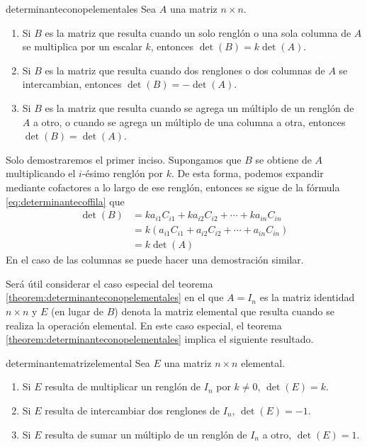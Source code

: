 \begin{theorem}{}{determinanteconopelementales}
    Sea $A$ una matriz $n \times n$.
    \begin{enumerate}[label=\alph*), topsep=6pt, itemsep=0pt]
        \item Si $B$ es la matriz que resulta cuando un solo renglón o una sola columna de $A$ se multiplica por un escalar $k$, entonces $\det(B) = k \det(A)$.
        \item Si $B$ es la matriz que resulta cuando dos renglones o dos columnas de $A$ se intercambian, entonces $\det(B) = -\det(A)$.
        \item Si $B$ es la matriz que resulta cuando se agrega un múltiplo de un renglón de $A$ a otro, o cuando se agrega un múltiplo de una columna a otra, entonces $\det(B) = \det(A)$.
    \end{enumerate}

    \newpage
    \demostracion Solo demostraremos el primer inciso. 
    Supongamos que $B$ se obtiene de $A$ multiplicando el $i$-ésimo renglón por $k$. De esta forma, podemos expandir mediante cofactores a lo largo de ese renglón, entonces se sigue de la fórmula \eqref{eq:determinantecoffila} que
    \begin{align*}
        \det(B) & = ka_{i1}C_{i1} + ka_{i2}C_{i2} + \cdots + ka_{in}C_{in} \\
        & = k\left(a_{i1}C_{i1} + a_{i2}C_{i2} + \cdots + a_{in}C_{in}\right) \\
        & = k \det(A)
    \end{align*}
    En el caso de las columnas se puede hacer una demostración similar.
\end{theorem}

Será útil considerar el caso especial del teorema \ref{theorem:determinanteconopelementales} en el que $A = I_n$ es la matriz identidad $n \times n$ y $E$ (en lugar de $B$) denota la matriz elemental que resulta cuando se realiza la operación elemental. En este caso especial, el teorema \ref{theorem:determinanteconopelementales} implica el siguiente resultado.

\begin{theorem}{}{determinantematrizelemental}
    Sea $E$ una matriz $n \times n$ elemental.
    \begin{enumerate}[label=\alph*), topsep=6pt, itemsep=0pt]
        \item Si $E$ resulta de multiplicar un renglón de $I_n$ por $k \neq 0$, $\det(E) = k$.
        \item Si $E$ resulta de intercambiar dos renglones de $I_n$, $\det(E) = -1$.
        \item Si $E$ resulta de sumar un múltiplo de un renglón de $I_n$ a otro, $\det(E) = 1$.
    \end{enumerate}
\end{theorem}


